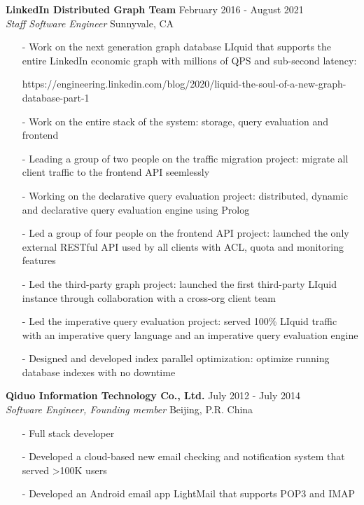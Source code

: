 \documentclass[mm, 7pt]{resume} %
\begin{document}
\begin{resume}
\textbf{LinkedIn Distributed Graph Team} \hfill February 2016 - August 2021 \\
{\sl Staff Software Engineer}  \hfill Sunnyvale, CA
\begin{itemize} \itemsep -2pt
\item[-] Work on the next generation graph database LIquid that supports the entire LinkedIn economic graph with millions of QPS and sub-second latency:
\item[ ] https://engineering.linkedin.com/blog/2020/liquid-the-soul-of-a-new-graph-database-part-1
\item[-] Work on the entire stack of the system: storage, query evaluation and frontend
\item[-] Leading a group of two people on the traffic migration project: migrate all client traffic to the frontend API seemlessly
\item[-] Working on the declarative query evaluation project: distributed, dynamic and declarative query evaluation engine using Prolog
\item[-] Led a group of four people on the frontend API project: launched the only external RESTful API used by all clients with ACL, quota and monitoring features
\item[-] Led the third-party graph project: launched the first third-party LIquid instance through collaboration with a cross-org client team
\item[-] Led the imperative query evaluation project: served 100\% LIquid traffic with an imperative query language and an imperative query evaluation engine
\item[-] Designed and developed index parallel optimization: optimize running database indexes with no downtime
\end{itemize}

\textbf{Qiduo Information Technology Co., Ltd.}  \hfill  July 2012 - July 2014 \\
{\sl Software Engineer, Founding member}                          \hfill  Beijing, P.R. China
\begin{itemize} \itemsep -2pt
\item[-] Full stack developer
\item[-] Developed a cloud-based new email checking and notification system that served >100K users
\item[-] Developed an Android email app LightMail that supports POP3 and IMAP
\end{itemize}



\end{resume}
\end{document}

